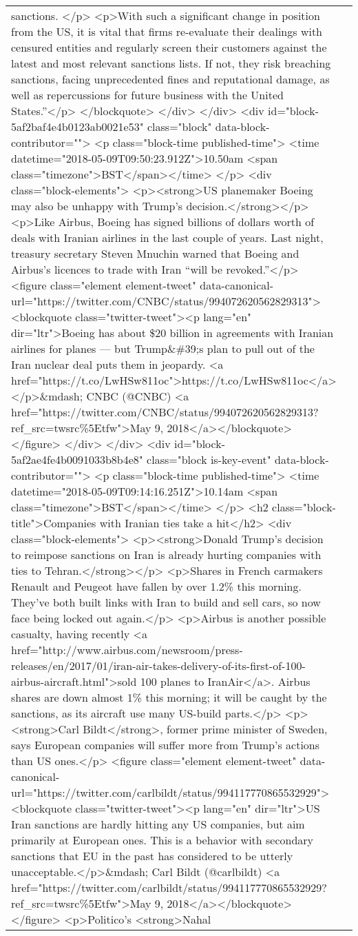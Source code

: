 \documentclass[]{article}
\begin{document}
\begin{table}[!h]
{\begin{tabular}[t]{ll}
sanctions. </p> <p>With such a significant change in position from the US, it is vital that firms re-evaluate their dealings with censured entities and regularly screen their customers against the latest and most relevant sanctions lists. If not, they risk breaching sanctions, facing unprecedented fines and reputational damage, as well as repercussions for future business with the United States.”</p> </blockquote> </div>   </div> <div id="block-5af2baf4e4b0123ab0021e53" class="block" data-block-contributor=""> <p class="block-time published-time"> <time datetime="2018-05-09T09:50:23.912Z">10.50am <span class="timezone">BST</span></time> </p>    <div class="block-elements">  <p><strong>US planemaker Boeing may also be unhappy with Trump’s decision.</strong></p> <p>Like Airbus, Boeing has signed billions of dollars worth of deals with Iranian airlines in the last couple of years. Last night, treasury secretary Steven Mnuchin warned that Boeing and Airbus’s licences to trade with Iran “will be revoked.”</p>  <figure class="element element-tweet" data-canonical-url="https://twitter.com/CNBC/status/994072620562829313">  <blockquote class="twitter-tweet"><p lang="en" dir="ltr">Boeing has about \$20 billion in agreements with Iranian airlines for planes — but Trump\&\#39;s plan to pull out of the Iran nuclear deal puts them in jeopardy. <a href="https://t.co/LwHSw811oc">https://t.co/LwHSw811oc</a></p>\&mdash; CNBC (@CNBC) <a href="https://twitter.com/CNBC/status/994072620562829313?ref\_src=twsrc\%5Etfw">May 9, 2018</a></blockquote>  </figure> </div>   </div> <div id="block-5af2ae4fe4b0091033b8b4e8" class="block is-key-event" data-block-contributor=""> <p class="block-time published-time"> <time datetime="2018-05-09T09:14:16.251Z">10.14am <span class="timezone">BST</span></time> </p>   <h2 class="block-title">Companies with Iranian ties take a hit</h2>  <div class="block-elements">  <p><strong>Donald Trump’s decision to reimpose sanctions on Iran is already hurting companies with ties to Tehran.</strong></p> <p>Shares in French carmakers Renault and Peugeot have fallen by over 1.2\% this morning. They’ve both built links with Iran to build and sell cars, so now face being locked out again.</p> <p>Airbus is another possible casualty, having recently <a href="http://www.airbus.com/newsroom/press-releases/en/2017/01/iran-air-takes-delivery-of-its-first-of-100-airbus-aircraft.html">sold 100 planes to IranAir</a>. Airbus shares are down almost 1\% this morning; it will be caught by the sanctions, as its aircraft use many US-build parts.</p> <p><strong>Carl Bildt</strong>, former prime minister of Sweden, says European companies will suffer more from Trump’s actions than US ones.</p>  <figure class="element element-tweet" data-canonical-url="https://twitter.com/carlbildt/status/994117770865532929">  <blockquote class="twitter-tweet"><p lang="en" dir="ltr">US Iran sanctions are hardly hitting any US companies, but aim primarily at European ones. This is a behavior with secondary sanctions that EU in the past has considered to be utterly unacceptable.</p>\&mdash; Carl Bildt (@carlbildt) <a href="https://twitter.com/carlbildt/status/994117770865532929?ref\_src=twsrc\%5Etfw">May 9, 2018</a></blockquote>  </figure>  <p>Politico’s <strong>Nahal 
\end{tabular}}
\end{table}
\end{document}
